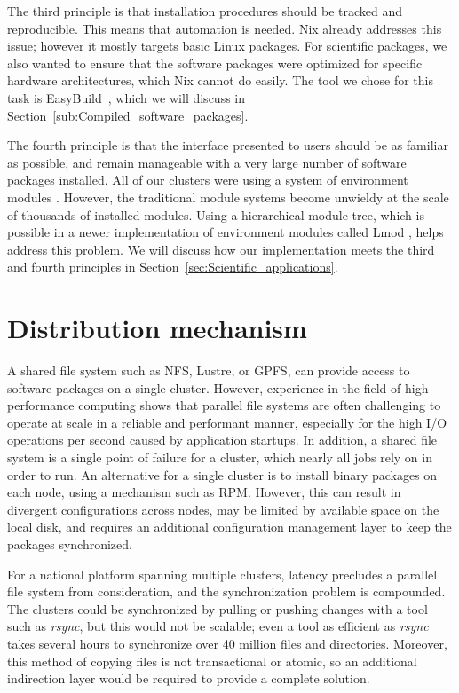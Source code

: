 \documentclass[sigconf]{acmart}
\begin{document}
The third principle is that installation procedures should be tracked and reproducible. This means that automation is needed. Nix already addresses this issue; however it mostly targets basic Linux packages. For scientific packages, we also wanted to ensure that the software packages were optimized for specific hardware architectures, which Nix cannot do easily. The tool we chose for this task is EasyBuild~\cite{EasyBuild2012,EasyBuild2014,EasyBuild2016}, which we will discuss in Section~\ref{sub:Compiled_software_packages}.

The fourth principle is that the interface presented to users should be as familiar as possible, and remain manageable with a very large number of software packages installed. All of our clusters were using a system of environment modules \cite{Modules1991,Modules1996}. However, the traditional module systems become unwieldy at the scale of thousands of installed modules. Using a hierarchical module tree, which is possible in a newer implementation of environment modules called Lmod \cite{Lmod}, helps address this problem. We will discuss how our implementation meets the third and fourth principles in Section~\ref{sec:Scientific_applications}.

\section{Distribution mechanism}
\label{sec:Distribution_mechanism}
A shared file system such as NFS, Lustre, or GPFS, can provide access to software packages on a single cluster. However, experience in the field of high performance computing shows that parallel file systems are often challenging to operate at scale in a reliable and performant manner, especially for the high I/O operations per second caused by application startups. In addition, a shared file system is a single point of failure for a cluster, which nearly all jobs rely on in order to run. An alternative for a single cluster is to install binary packages on each node, using a mechanism such as RPM. However, this can result in divergent configurations across nodes, may be limited by available space on the local disk, and requires an additional configuration management layer to keep the packages synchronized. 

For a national platform spanning multiple clusters, latency precludes a parallel file system from consideration, and the synchronization problem is compounded. The clusters could be synchronized by pulling or pushing changes with a tool such as {\it rsync}, but this would not be scalable; even a tool as efficient as {\it rsync} takes several hours to synchronize over 40 million files and directories. Moreover, this method of copying files is not transactional or atomic, so an additional indirection layer would be required to provide a complete solution.
\end{document}
